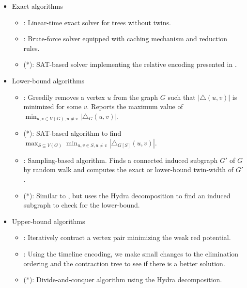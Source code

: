 \documentclass[a4paper,UKenglish,cleveref, autoref, thm-restate]{lipics-v2021}
\begin{document}
\begin{itemize}
    \item Exact algorithms
    \begin{itemize}
        \item \primetreesolver : Linear-time exact solver for trees without twins.
        \item \branchsolver : Brute-force solver equipped with caching mechanism and reduction rules.
        \item \directsolver (*): SAT-based solver implementing the relative encoding presented in \cite{schidler_sat_2021}.
    \end{itemize}
    \item Lower-bound algorithms
    \begin{itemize}
        \item \lbgreedy : Greedily removes a vertex $u$ from the graph $G$
        such that $|\triangle(u,v)|$ is minimized for some $v$.
        Reports the maximum value of $\displaystyle \min_{u,v \in V(G), u \neq v} |\triangle_{G} (u,v)|$.
        \item \lbcore (*): SAT-based algorithm to find 
        $\displaystyle \max_{S \subseteq V(G)} \min_{u,v \in S, u \neq v} |\triangle_{G[S]} (u,v)|$.
        \item \lbsample : Sampling-based algorithm.
        Finds a connected induced subgraph $G'$ of $G$
        by random walk and computes the exact or lower-bound twin-width of $G'$.
        \item \lbseparate (*): Similar to \lbsample, but uses the Hydra decomposition to
        find an induced subgraph to check for the lower-bound.
    \end{itemize}
    \item Upper-bound algorithms
    \begin{itemize}
        \item \ubgreedy : Iteratively contract a vertex pair minimizing the weak red potential.
        \item \ublocalsearch : Using the timeline encoding, we make small changes to
        the elimination ordering and the contraction tree to see if there is a better solution.
        \item \ubseparate (*): Divide-and-conquer algorithm using the Hydra decomposition.
    \end{itemize}
\end{itemize}

\end{document}
